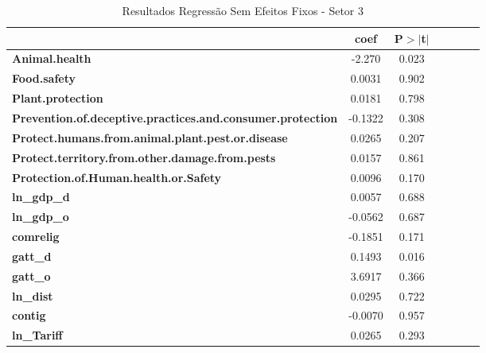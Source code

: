 
\begin{table}[ht!]
    \begin{center}
        \begin{tabular}{lcccccc}
            & \textbf{coef} &\textbf{P$> |$t$|$}\\
            \midrule
            \textbf{Animal.health}                                 & -2.270       &  0.023  \\
\textbf{Food.safety}                                               &       0.0031  &  0.902  \\
\textbf{Plant.protection}                                          &       0.0181  &  0.798  \\
\textbf{Prevention.of.deceptive.practices.and.consumer.protection} &      -0.1322  &  0.308  \\
\textbf{Protect.humans.from.animal.plant.pest.or.disease}          &       0.0265  &  0.207  \\
\textbf{Protect.territory.from.other.damage.from.pests}            &       0.0157  &  0.861  \\
\textbf{Protection.of.Human.health.or.Safety}                      &       0.0096  &  0.170  \\
\textbf{ln\_gdp\_d}                                                &       0.0057  &  0.688  \\
\textbf{ln\_gdp\_o}                                                &      -0.0562  &  0.687  \\
\textbf{comrelig}                                                  &      -0.1851  &  0.171  \\
\textbf{gatt\_d}                                                   &       0.1493  &  0.016  \\
\textbf{gatt\_o}                                                   &       3.6917  &  0.366  \\
\textbf{ln\_dist}                                                  &       0.0295  &  0.722  \\
\textbf{contig}                                                    &      -0.0070  &  0.957  \\
\textbf{ln\_Tariff}                                                &       0.0265  &  0.293  \\
\bottomrule
\end{tabular}
\caption{Resultados Regressão Sem Efeitos Fixos - Setor 3}
\end{center}
\end{table}
